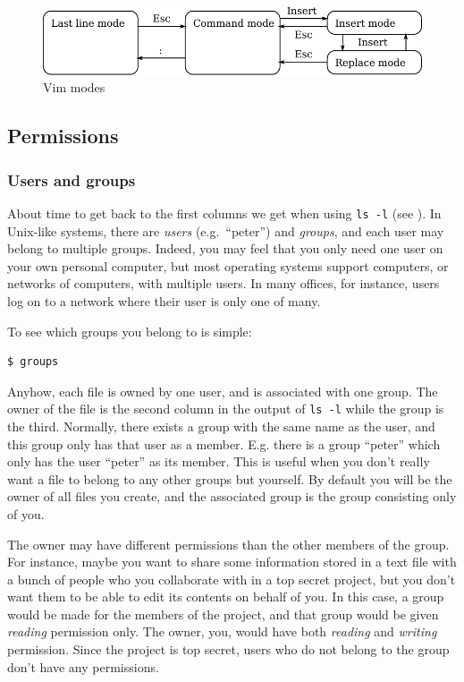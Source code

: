 \begin{figure}
	\centering
	\includegraphics[scale=0.8]{graphics/vi.pdf}
	\caption{Vim modes}
	\label{fig:bash:vi}
\end{figure}

\subsection{Permissions}\label{sec:bash:permissions}
\subsubsection{Users and groups}
About time to get back to the first columns we get when using \verb|ls -l| (see ). In Unix-like systems, there are \emph{users} (e.g.\ ``peter'') and \emph{groups}, and each user may belong to multiple groups. Indeed, you may feel that you only need one user on your own personal computer, but most operating systems support computers, or networks of computers, with multiple users. In many offices, for instance, users log on to a network where their user is only one of many.

To see which groups you belong to is simple:

\begin{verbatim}
$ groups
\end{verbatim}

Anyhow, each file is owned by one user, and is associated with one group. The owner of the file is the second column in the output of \verb|ls -l| while the group is the third. Normally, there exists a group with the same name as the user, and this group only has that user as a member. E.g. there is a group ``peter'' which only has the user ``peter'' as its member. This is useful when you don't really want a file to belong to any other groups but yourself. By default you will be the owner of all files you create, and the associated group is the group consisting only of you.

The owner may have different permissions than the other members of the group. For instance, maybe you want to share some information stored in a text file with a bunch of people who you collaborate with in a top secret project, but you don't want them to be able to edit its contents on behalf of you. In this case, a group would be made for the members of the project, and that group would be given \emph{reading} permission only. The owner, you, would have both \emph{reading} and \emph{writing} permission. Since the project is top secret, users who do not belong to the group don't have any permissions.

